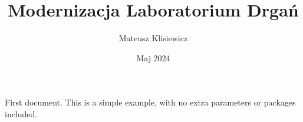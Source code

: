 \documentclass[12pt]{article}
\title{Modernizacja Laboratorium Drgań}
\author{Mateusz Klisiewicz}
\date{Maj 2024}
\begin{document}
\maketitle
First document. This is a simple example, with no 
extra parameters or packages included.
\end{document}
